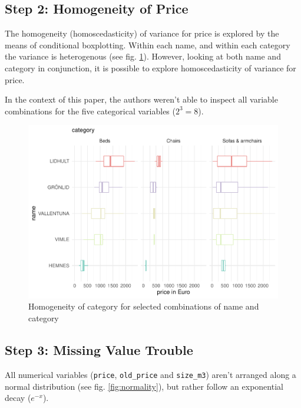 \documentclass[a4paper, nobind]{templates/ociamthesis}
\begin{document}
\hypertarget{step-2-homogeneity-of-price}{%
\subsection{Step 2: Homogeneity of Price}\label{step-2-homogeneity-of-price}}

The homogeneity (homoscedasticity) of variance for price is explored by the means of conditional boxplotting.
Within each name, and within each category the variance is heterogenous (see fig. \ref{fig:homogeneity}). However, looking at both name and category in conjunction, it is possible to explore homoscedasticity of variance for price.

In the context of this paper, the authors weren't able to inspect all variable combinations for the five categorical variables (\(2^3=8\)).

\begin{figure}
\includegraphics[width=1\linewidth]{_main_files/figure-latex/homogeneity-1} \caption{Homogeneity of category for selected combinations of name and category}\label{fig:homogeneity}
\end{figure}

\hypertarget{step-3-missing-value-trouble}{%
\subsection{Step 3: Missing Value Trouble}\label{step-3-missing-value-trouble}}

All numerical variables (\texttt{price}, \texttt{old\_price} and \texttt{size\_m3}) aren't arranged along a normal distribution (see fig. \ref{fig:normality}), but rather follow an exponential decay (\(e^{-x}\)).
\end{document}
